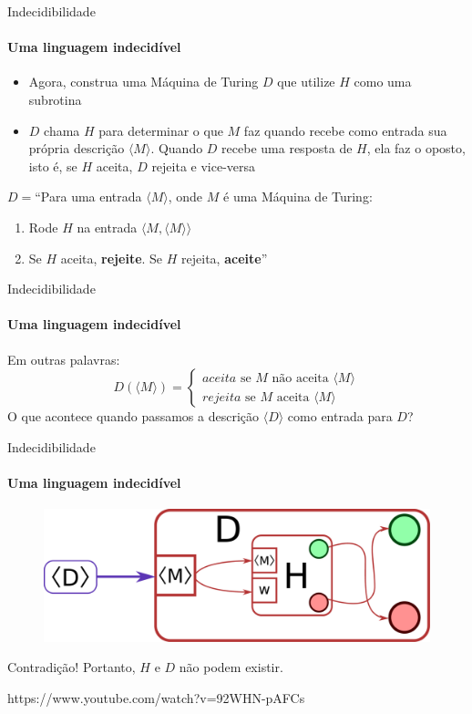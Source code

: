 \documentclass{beamer}
\begin{document}
\begin{frame}{Indecidibilidade}
	\framesubtitle{Uma linguagem indecidível}
	\begin{itemize}
		\item Agora, construa uma Máquina de Turing $D$ que utilize $H$ como uma subrotina
		\item $D$ chama $H$ para determinar o que $M$ faz quando recebe como entrada sua própria descrição $\langle M\rangle$. Quando $D$ recebe uma resposta de $H$, ela faz o oposto, isto é, se $H$ aceita, $D$ rejeita e vice-versa
	\end{itemize}
	$D = $``Para uma entrada $\langle M\rangle$, onde $M$ é uma Máquina de Turing:
	\begin{enumerate}
		\item Rode $H$ na entrada $\langle M, \langle M\rangle\rangle$
		\item Se $H$ aceita, \textbf{rejeite}. Se $H$ rejeita, \textbf{aceite}''
	\end{enumerate}
\end{frame}
\begin{frame}{Indecidibilidade}
	\framesubtitle{Uma linguagem indecidível}
	Em outras palavras:
	\begin{equation*}
	D\left(\langle M\rangle\right) = \begin{cases}
	aceita\text{ se }M\text{ não aceita }\langle M\rangle \\
	rejeita\text{ se }M\text{ aceita }\langle M\rangle
	\end{cases}
	\end{equation*}
	O que acontece quando passamos a descrição $\langle D\rangle$ como entrada para $D$?
\end{frame}
\begin{frame}{Indecidibilidade}
	\framesubtitle{Uma linguagem indecidível}
	\begin{figure}
		\includegraphics[width=0.8\paperwidth]{resources/halt}
	\end{figure}\pause
	Contradição! Portanto, $H$ e $D$ não podem existir.\pause
	
	https://www.youtube.com/watch?v=92WHN-pAFCs
\end{frame}
\end{document}
